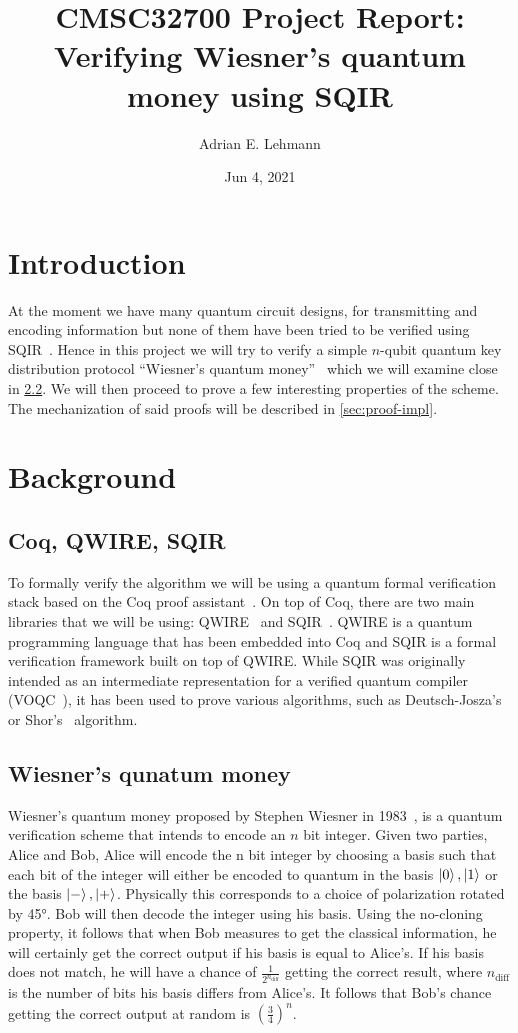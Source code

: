 \documentclass{article}
\title{CMSC32700 Project Report: Verifying Wiesner's quantum money using SQIR}
\author{Adrian E. Lehmann}
\date{Jun 4, 2021}
\begin{document}
\maketitle

\section{Introduction}
At the moment we have many quantum circuit designs, for transmitting and encoding information but none of them have been tried to be verified using SQIR~\cite{SQIR}. 
Hence in this project we will try to verify a simple $n$-qubit quantum key distribution protocol ``Wiesner's quantum money''~\cite{wiesner} which we will examine close in \cref{sec:wiesner}. 
We will then proceed to prove a few interesting properties of the scheme.
The mechanization of said proofs will be described in \cref{sec:proof-impl}.

\section{Background}

\subsection{Coq, QWIRE, SQIR}
To formally verify the algorithm we will be using a quantum formal verification stack based on the Coq proof assistant~\cite{Coq}.
On top of Coq, there are two main libraries that we will be using: QWIRE~\cite{QWIRE} and SQIR~\cite{SQIR}.
QWIRE is a quantum programming language that has been embedded into Coq and SQIR is a formal verification framework built on top of QWIRE.
While SQIR was originally intended as an intermediate representation for a verified quantum compiler (VOQC~\cite{voqc}), it has been used to prove various algorithms, such as Deutsch-Josza's~\cite{deutsch} or Shor's~\cite{shor} algorithm.


\subsection{Wiesner's qunatum money}\label{sec:wiesner}

Wiesner's quantum money proposed by Stephen Wiesner in 1983~\cite{wiesner}, is a quantum verification scheme that intends to encode an $n$ bit integer. 
Given two parties, Alice and Bob, Alice will encode the n bit integer by choosing a basis such that each bit of the integer will either be encoded to quantum in the basis $\ket{0}, \ket{1}$ or the basis $\ket{-},\ket{+}$.
Physically this corresponds to a choice of polarization rotated by \ang{45}.
Bob will then decode the integer using his basis.
Using the no-cloning property, it follows that when Bob measures to get the classical information, he will certainly get the correct output if his basis is equal to Alice's.
If his basis does not match, he will have a chance of $\frac{1}{2^{n_{\text{diff}}}}$ getting the correct result, where $n_{\text{diff}}$ is the number of bits his basis differs from Alice's.
It follows that Bob's chance getting the correct output at random is $(\frac{3}{4})^n$.
\end{document}

